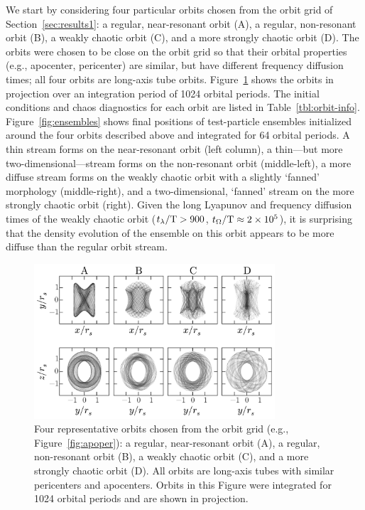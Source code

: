 \documentclass{mn2e}
\newcommand{\periods}{\ensuremath{{\rm T}}}
\begin{document}
We start by considering four particular orbits chosen from the orbit grid of Section~\ref{sec:results1}: a regular, near-resonant orbit (A), a regular, non-resonant orbit (B), a weakly chaotic orbit (C), and a more strongly chaotic orbit (D). The orbits were chosen to be close on the orbit grid so that their orbital properties (e.g., apocenter, pericenter) are similar, but have different frequency diffusion times; all four orbits are long-axis tube orbits. Figure~\ref{fig:orbits} shows the orbits in projection over an integration period of 1024 orbital periods. The initial conditions and chaos diagnostics for each orbit are listed in Table~\ref{tbl:orbit-info}. Figure~\ref{fig:ensembles} shows final positions of test-particle ensembles initialized around the four orbits described above and integrated for 64 orbital periods. A thin stream forms on the near-resonant orbit (left column), a thin---but more two-dimensional---stream forms on the non-resonant orbit (middle-left), a more diffuse stream forms on the weakly chaotic orbit with a slightly `fanned' morphology (middle-right), and a two-dimensional, `fanned' stream on the more strongly chaotic orbit (right). Given the long Lyapunov and frequency diffusion times of the weakly chaotic orbit ($t_\lambda/\periods > 900$, $t_\Omega/\periods \approx 2\times10^5$), it is surprising that the density evolution of the ensemble on this orbit appears to be more diffuse than the regular orbit stream.

\begin{figure}[h]%
\begin{center}
\includegraphics[width=0.8\textwidth]{figures/four-orbits.pdf}
\caption{Four representative orbits chosen from the orbit grid (e.g., Figure~\ref{fig:apoper}): a regular, near-resonant orbit (A), a regular, non-resonant orbit (B), a weakly chaotic orbit (C), and a more strongly chaotic orbit (D). All orbits are long-axis tubes with similar pericenters and apocenters. Orbits in this Figure were integrated for 1024 orbital periods and are shown in projection.}
\label{fig:orbits}
\end{center}
\end{figure}
\end{document}
